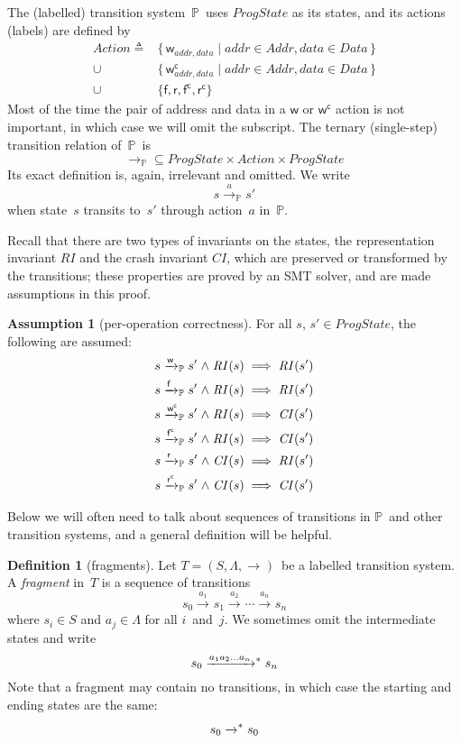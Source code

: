 \documentclass[letterpaper,twocolumn,10pt]{article}
\theoremstyle{definition}
\newtheorem{definition}[theorem]{Definition}
\newtheorem{assumption}[theorem]{Assumption}
\newcommand{\defeq}{\triangleq}
\newcommand{\conj}{\mathrel\land}
\newcommand{\awa}[2]{\mathrlap{#2}\hphantom{#1}} %
\renewcommand{\i}[1]{\ensuremath{\mathit{#1}}}
\newcommand{\Prog}{\ensuremath{\mathbb P}}
\newcommand{\actw}{\mathsf w}
\newcommand{\actwc}{\mathsf w^\mathsf{c}}
\newcommand{\actf}{\mathsf f}
\newcommand{\actr}{\mathsf r}
\newcommand{\actfc}{\mathsf{f^c}}
\newcommand{\actrc}{\mathsf{r^c}}
\newcommand{\ttIn}[2]{\xrightarrow{#1}_{#2}}
\newcommand{\ttsIn}[2]{\xrightarrow{#1}^{\raisebox{-3pt}{\scriptsize\ensuremath{*}}}_{#2}}
\newcommand{\ttP}[1]{\ttIn{#1}{\Prog}}
\begin{document}
The (labelled) transition system~\Prog\ uses \i{ProgState} as its states, and its actions (labels) are defined by%
\begin{align*}
	\i{Action} \defeq{} &\{\, \actw_{\i{addr}, \i{data}} \mid \i{addr} \in \i{Addr}, \i{data} \in \i{Data} \,\} \\
	\cup \ &\{\, \actwc_{\i{addr}, \i{data}} \mid \i{addr} \in \i{Addr}, \i{data} \in \i{Data} \,\}\\
	\cup \ &\{ \actf, \actr, \actfc, \actrc \}
\end{align*}
Most of the time the pair of address and data in a $\actw$ or $\actwc$ action is not important, in which case we will omit the subscript.
The ternary (single-step) transition relation of~\Prog\ is
$${\ttP{}} \subseteq \i{ProgState} \times \i{Action} \times \i{ProgState}$$
Its exact definition is, again, irrelevant and omitted.
We write
$$s \ttP{a} s'$$
when state~$s$ transits to~$s'$ through action~$a$ in~\Prog.

Recall that there are two types of invariants on the states, the representation invariant \i{RI} and the crash invariant \i{CI}, which are preserved or transformed by the transitions; these properties are proved by an SMT solver, and are made assumptions in this proof.
\begin{assumption}[per-operation correctness]
For all $s$, $s' \in \i{ProgState}$, the following are assumed:
\begin{align*}
s \ttP{\awa{\actw}{\actw }} s' \conj \i{RI}(s) &\implies \i{RI}(s')\\
s \ttP{\awa{\actw}{\actf }} s' \conj \i{RI}(s) &\implies \i{RI}(s')\\
s \ttP{\awa{\actw}{\actwc}} s' \conj \i{RI}(s) &\implies \i{CI}(s')\\
s \ttP{\awa{\actw}{\actfc}} s' \conj \i{RI}(s) &\implies \i{CI}(s')\\
s \ttP{\awa{\actw}{\actr }} s' \conj \i{CI}(s) &\implies \i{RI}(s')\\
s \ttP{\awa{\actw}{\actrc}} s' \conj \i{CI}(s) &\implies \i{CI}(s')
\end{align*}
\end{assumption}

Below we will often need to talk about sequences of transitions in \Prog\ and other transition systems, and a general definition will be helpful.
\begin{definition}[fragments]
Let $T = (S, \Lambda, \ttIn{}{})$~be a labelled transition system.
A \emph{fragment} in~$T$ is a sequence of transitions
$$ s_0 \ttIn{a_1}{} s_1 \ttIn{a_2}{} \cdots \ttIn{a_n}{} s_n $$
where $s_i \in S$ and $a_j \in \Lambda$ for all $i$~and~$j$.
We sometimes omit the intermediate states and write
$$ s_0 \ttsIn{a_1a_2\ldots a_n}{} s_n $$
Note that a fragment may contain no transitions, in which case the starting and ending states are the same: 
$$ s_0 \ttsIn{\vphantom{a_n}}{} s_0 $$
\end{definition}
\end{document}
